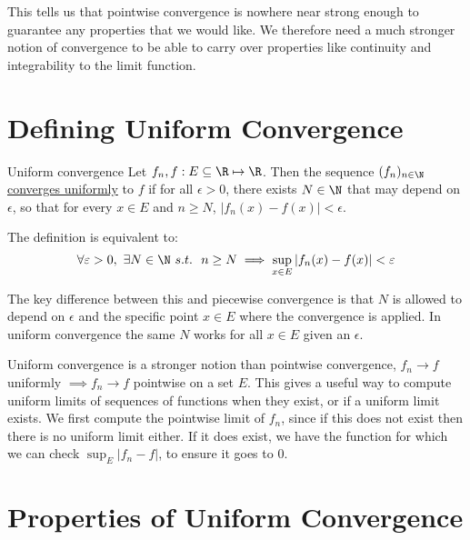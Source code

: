 \documentclass[../Main.tex]{subfiles}
\begin{document}
This tells us that pointwise convergence is nowhere near strong enough to guarantee any properties that we would like. We therefore need a much stronger notion of convergence to be able to carry over properties like continuity and integrability to the limit function.
\section{Defining Uniform Convergence}
\begin{definition}{Uniform convergence}
    Let $f_n, f : E \subseteq \R \mapsto \R$. Then the sequence $(f_n)_{n \in \N}$ \underline{converges uniformly} to $f$ if for all $\epsilon > 0$, there exists $N \in \N$ that may depend on $\epsilon$, so that for every $x \in E$ and $n \geq N$, $|f_n(x) - f(x)| < \epsilon$.
\end{definition}
\begin{remark}
    The definition is equivalent to:
    \begin{equation*}
        \forall \epsilon > 0,~ \exists N \in \N~s.t.~~n \geq N \implies \sup_{x \in E} |f_n(x) - f(x)| < \epsilon
    \end{equation*}
\end{remark}
The key difference between this and piecewise convergence is that $N$ is allowed to depend on $\epsilon$ and the specific point $x \in E$ where the convergence is applied. In uniform convergence the same $N$ works for all $x \in E$ given an $\epsilon$.

Uniform convergence is a stronger notion than pointwise convergence, $f_n \to f$ uniformly $\implies f_n \to f$ pointwise on a set $E$. This gives a useful way to compute uniform limits of sequences of functions when they exist, or if a uniform limit exists. We first compute the pointwise limit of $f_n$, since if this does not exist then there is no uniform limit either. If it does exist, we have the function for which we can check $\sup_E |f_n - f|$, to ensure it goes to $0$.
\section{Properties of Uniform Convergence}
\end{document}
